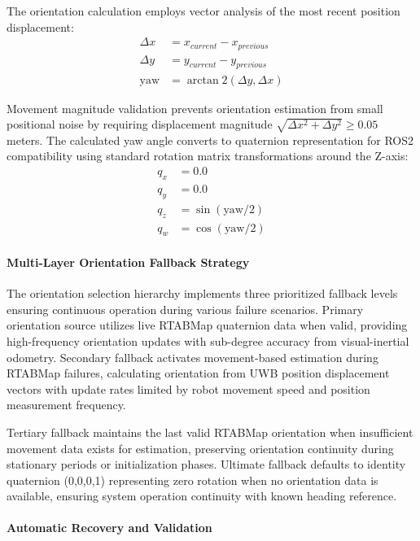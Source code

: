 The orientation calculation employs vector analysis of the most recent position displacement:
\begin{align}
\Delta x &= x_{current} - x_{previous} \\
\Delta y &= y_{current} - y_{previous} \\
\text{yaw} &= \arctan2(\Delta y, \Delta x)
\end{align}

Movement magnitude validation prevents orientation estimation from small positional noise by requiring displacement magnitude $\sqrt{\Delta x^2 + \Delta y^2} \geq 0.05$ meters. The calculated yaw angle converts to quaternion representation for ROS2 compatibility using standard rotation matrix transformations around the Z-axis:
\begin{align}
q_x &= 0.0 \\
q_y &= 0.0 \\
q_z &= \sin(\text{yaw}/2) \\
q_w &= \cos(\text{yaw}/2)
\end{align}

\paragraph{Multi-Layer Orientation Fallback Strategy}

The orientation selection hierarchy implements three prioritized fallback levels ensuring continuous operation during various failure scenarios. Primary orientation source utilizes live RTABMap quaternion data when valid, providing high-frequency orientation updates with sub-degree accuracy from visual-inertial odometry. Secondary fallback activates movement-based estimation during RTABMap failures, calculating orientation from UWB position displacement vectors with update rates limited by robot movement speed and position measurement frequency.

Tertiary fallback maintains the last valid RTABMap orientation when insufficient movement data exists for estimation, preserving orientation continuity during stationary periods or initialization phases. Ultimate fallback defaults to identity quaternion (0,0,0,1) representing zero rotation when no orientation data is available, ensuring system operation continuity with known heading reference.

\paragraph{Automatic Recovery and Validation}

